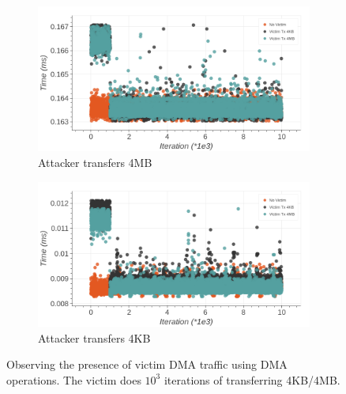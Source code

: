 \begin{figure}
     \centering
     
     \begin{subfigure}[b]{\textwidth}
         \centering
        \includegraphics[width=\textwidth]{figures/interconnect-sc/dma/dma_contention_4MB.png}
        \caption{Attacker transfers 4MB}
        \label{fig:dma-contention-4mb}
     \end{subfigure}

    \hfill
     
     \begin{subfigure}[b]{\textwidth}
        \centering
        \includegraphics[width=\textwidth]{figures/interconnect-sc/dma/dma_contention_4KB.png}
        \caption{Attacker transfers 4KB}
        \label{fig:dma-contention-4kb}
     \end{subfigure}

     \caption{Observing the presence of victim DMA traffic using DMA operations. The victim does $10^3$ iterations of transferring 4KB/4MB.}
    \label{fig:dma-contention}
\end{figure}


